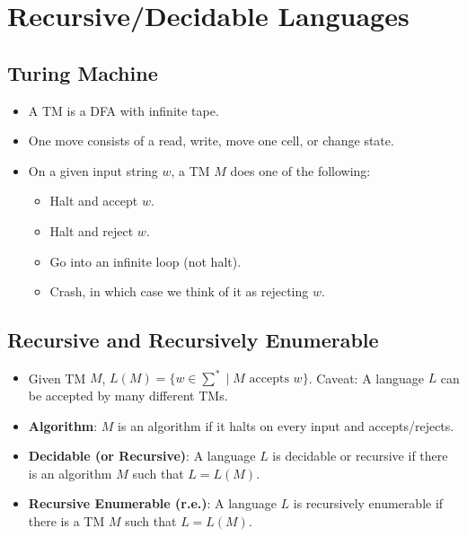 
\section{Recursive/Decidable Languages}

\subsection{Turing Machine}
\begin{itemize}
    \item A TM is a DFA with infinite tape.
    \item One move consists of a read, write, move one cell, or change state.
    \item On a given input string $w$, a TM $M$ does one of the following:
    \begin{itemize}
        \item Halt and accept $w$.
        \item Halt and reject $w$.
        \item Go into an infinite loop (not halt).
        \item Crash, in which case we think of it as rejecting $w$.
    \end{itemize}
\end{itemize}

\subsection{Recursive and Recursively Enumerable}
\begin{itemize}
    \item Given TM $M$, $L(M) = \{ w \in \sum^\ast \mid \text{$M$ accepts $w$} \}$. Caveat: A language $L$ can be accepted by many different TMs.
    \item \textbf{Algorithm}: $M$ is an algorithm if it halts on every input and accepts/rejects.
    \item \textbf{Decidable (or Recursive)}: A language $L$ is decidable or recursive if there is an algorithm $M$ such that $L = L(M)$.
    \item \textbf{Recursive Enumerable (r.e.)}: A language $L$ is recursively enumerable if there is a TM $M$ such that $L = L(M)$.
\end{itemize}

